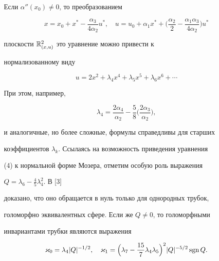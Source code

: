  


Если $\alpha''(x_0)\ne 0$, то преобразованием 


\begin{equation} 


x=x_0+x^*-\frac{\alpha_3}{4\alpha_2}u^*,\quad 


u=u_0+\alpha_1 x^*+\biggl(\frac{\alpha_2}{2}- 


\frac{\alpha_1\alpha_3}{4\alpha_2}\biggr)u^* 


\end{equation} 


плоскости $\Bbb R^2_{(x,u)}$ это уравнение можно привести к 


нормализованному виду 


\begin{equation} 


u=2x^2+\lambda_4x^4+\lambda_5x^5+\lambda_6x^6+\dotsb 


\end{equation} 


При этом, например, 


\begin{equation} 


\lambda_4=\frac{2\alpha_4}{\alpha_2}-\frac{5}{8} 


\biggl(\frac{2\alpha_3}{\alpha_2}\biggr), 


\end{equation} 


и аналогичные, но более сложные, формулы справедливы для старших 


коэффициентов $\lambda_k$. Ссылаясь на возможность приведения уравнения 


(4) к нормальной форме Мозера, отметим особую роль выражения 


$Q=\lambda_6-\frac{4}{5}\lambda^2_4$. В [3] 


доказано, что оно обращается в нуль только для однородных трубок, 


голоморфно эквивалентных сфере. Если же $Q\ne 0$, то голоморфными 


инвариантами трубки являются выражения 


\begin{equation} 


\varkappa_0=\lambda_4|Q|^{-1/2},\quad 


\varkappa_1=\Bigl(\lambda_7-\frac{15}{7}\lambda_4\lambda_5 


\Bigr)^2|Q|^{-5/2}\sgn Q. 


\end{equation} 


